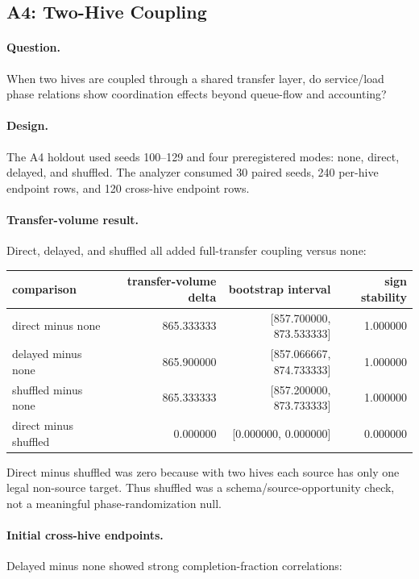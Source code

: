 \documentclass[11pt]{article}
\begin{document}
\subsection{A4: Two-Hive Coupling}

\paragraph{Question.}
When two hives are coupled through a shared transfer layer, do service/load
phase relations show coordination effects beyond queue-flow and accounting?

\paragraph{Design.}
The A4 holdout used seeds 100--129 and four preregistered modes: none, direct,
delayed, and shuffled. The analyzer consumed 30 paired seeds, 240 per-hive
endpoint rows, and 120 cross-hive endpoint rows.

\paragraph{Transfer-volume result.}
Direct, delayed, and shuffled all added full-transfer coupling versus none:

\begin{center}
\begin{tabular}{lrrr}
comparison & transfer-volume delta & bootstrap interval & sign stability \\
\hline
direct minus none & 865.333333 & [857.700000, 873.533333] & 1.000000 \\
delayed minus none & 865.900000 & [857.066667, 874.733333] & 1.000000 \\
shuffled minus none & 865.333333 & [857.200000, 873.733333] & 1.000000 \\
direct minus shuffled & 0.000000 & [0.000000, 0.000000] & 0.000000
\end{tabular}
\end{center}

Direct minus shuffled was zero because with two hives each source has only one
legal non-source target. Thus shuffled was a schema/source-opportunity check,
not a meaningful phase-randomization null.

\paragraph{Initial cross-hive endpoints.}
Delayed minus none showed strong completion-fraction correlations:
\end{document}
